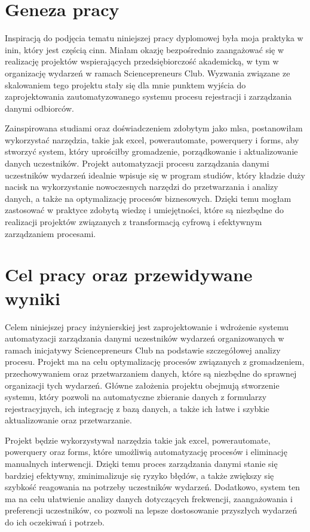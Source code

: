 \section{Geneza pracy}
Inspiracją do podjęcia tematu niniejszej pracy dyplomowej była moja praktyka w \gls{inin}, który jest częścią \gls{cinn}. Miałam okazję bezpośrednio zaangażować się w realizację projektów wspierających przedsiębiorczość akademicką, w tym w organizację wydarzeń w ramach Sciencepreneurs Club. Wyzwania związane ze skalowaniem tego projektu stały się dla mnie punktem wyjścia do zaprojektowania zautomatyzowanego systemu procesu rejestracji i zarządzania danymi odbiorców. 

Zainspirowana studiami oraz doświadczeniem zdobytym jako \gls{mlsa}, postanowiłam wykorzystać narzędzia, takie jak \gls{excel}, \gls{powerautomate}, \gls{powerquery} i \gls{forms}, aby stworzyć system, który uprościłby gromadzenie, porządkowanie i aktualizowanie danych uczestników. Projekt automatyzacji procesu zarządzania danymi uczestników wydarzeń idealnie wpisuje się w program studiów, który kładzie duży nacisk na wykorzystanie nowoczesnych narzędzi do przetwarzania i analizy danych, a także na optymalizację procesów biznesowych. Dzięki temu mogłam zastosować w praktyce zdobytą wiedzę i umiejętności, które są niezbędne do realizacji projektów związanych z transformacją cyfrową i efektywnym zarządzaniem procesami.
 
\section{Cel pracy oraz przewidywane wyniki}
Celem niniejszej pracy inżynierskiej jest zaprojektowanie i wdrożenie systemu automatyzacji zarządzania danymi uczestników wydarzeń organizowanych w ramach inicjatywy Sciencepreneurs Club na podstawie szczegółowej analizy procesu. Projekt ma na celu optymalizację procesów związanych z gromadzeniem, przechowywaniem oraz przetwarzaniem danych, które są niezbędne do sprawnej organizacji tych wydarzeń. Główne założenia projektu obejmują stworzenie systemu, który pozwoli na automatyczne zbieranie danych z formularzy rejestracyjnych, ich integrację z bazą danych, a także ich łatwe i szybkie aktualizowanie oraz przetwarzanie.

Projekt będzie wykorzystywał narzędzia takie jak \gls{excel}, \gls{powerautomate}, \gls{powerquery} oraz \gls{forms}, które umożliwią automatyzację procesów i eliminację manualnych interwencji. Dzięki temu proces zarządzania danymi stanie się bardziej efektywny, zminimalizuje się ryzyko błędów, a także zwiększy się szybkość reagowania na potrzeby uczestników wydarzeń. Dodatkowo, system ten ma na celu ułatwienie analizy danych dotyczących frekwencji, zaangażowania i preferencji uczestników, co pozwoli na lepsze dostosowanie przyszłych wydarzeń do ich oczekiwań i potrzeb.

